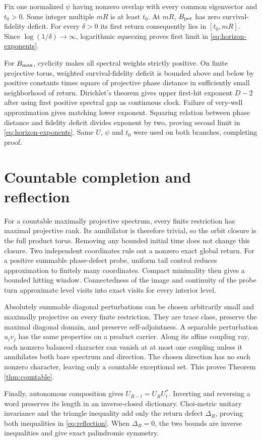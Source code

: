Fix one normalized $\psi$ having nonzero overlap with every common
eigenvector and $t_0>0$.  Some integer multiple $mR$ is at least $t_0$.
At $mR$, $B_{\rm per}$ has zero survival-fidelity deficit.  For every
$\delta>0$ its first return consequently lies in $[t_0,mR]$.  Since
$\log(1/\delta)\to\infty$, logarithmic squeezing proves first limit in
\eqref{eq:horizon-exponents}.

For $B_{\rm max}$, cyclicity makes all spectral weights strictly positive.
On finite projective torus, weighted survival-fidelity deficit is bounded
above and below by positive constants times square of projective phase
distance in sufficiently small neighborhood of return.  Dirichlet's theorem
gives upper first-hit exponent $D-2$ after using first positive spectral gap
as continuous clock.  Failure of very-well approximation gives matching
lower exponent.  Squaring relation between phase distance and fidelity
deficit divides exponent by two, proving second limit in
\eqref{eq:horizon-exponents}.  Same $U$, $\psi$ and $t_0$ were used on both
branches, completing proof.

\section{Countable completion and reflection}

For a countable maximally projective spectrum, every finite restriction has
maximal projective rank.  Its annihilator is therefore trivial, so the orbit
closure is the full product torus.  Removing any bounded initial time does
not change this closure.  Two independent coordinates rule out a nonzero
exact global return.  For a positive summable phase-defect probe, uniform
tail control reduces approximation to finitely many coordinates.  Compact
minimality then gives a bounded hitting window.  Connectedness of the image
and continuity of the probe turn approximate level visits into exact visits
for every interior level.

Absolutely summable diagonal perturbations can be chosen arbitrarily small
and maximally projective on every finite restriction.  They are trace class,
preserve the maximal diagonal domain, and preserve self-adjointness.  A
separable perturbation $u_i v_j$ has the same properties on a product
carrier.  Along its affine coupling ray, each nonzero balanced character can
vanish at at most one coupling unless it annihilates both bare spectrum and
direction.  The chosen direction has no such nonzero character, leaving only
a countable exceptional set.  This proves Theorem \ref{thm:countable}.

Finally, autonomous composition gives
$U_{R-t}=U_RU_t^*$.  Inverting and reversing a word preserves its length in
an inverse-closed dictionary.  Choi-metric unitary invariance and the
triangle inequality add only the return defect $\Delta_R$, proving both
inequalities in \eqref{eq:reflection}.  When $\Delta_R=0$, the two bounds are
inverse inequalities and give exact palindromic symmetry.

